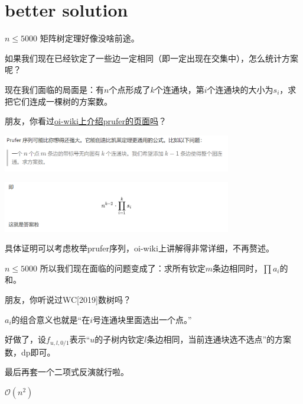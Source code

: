 \documentclass[9pt]{beamer}
\begin{document}
\section{better solution}
\begin{frame}{$n \le 5000$}
	矩阵树定理好像没啥前途。\pause

	如果我们现在已经钦定了一些边一定相同（即一定出现在交集中），怎么统计方案呢？

	现在我们面临的局面是：有$n$个点形成了$k$个连通块，第$i$个连通块的大小为$s_i$，求把它们连成一棵树的方案数。\pause

	朋友，你看过\href{https://oi-wiki.org/graph/prufer/}{oi-wiki上介绍prufer的页面吗}？

	\begin{center}
		\includegraphics[width=10cm]{prufer-query.png}

		\includegraphics[width=10cm]{prufer-answer.png}
	\end{center}
	\pause

	具体证明可以考虑枚举prufer序列，oi-wiki上讲解得非常详细，不再赘述。
\end{frame}
\begin{frame}{$n \le 5000$}
	所以我们现在面临的问题变成了：求所有钦定$m$条边相同时，$\prod a_i$的和。
	\pause
	
	朋友，你听说过WC[2019]数树吗？

	$a_i$的组合意义也就是“在$i$号连通块里面选出一个点。”
	\pause

	好做了，设$f_{u,l,0/1}$表示“$u$的子树内钦定$l$条边相同，当前连通块选不选点”的方案数，dp即可。

	最后再套一个二项式反演就行啦。\pause

	$\mathcal O(n^2)$
\end{frame}
\end{document}
